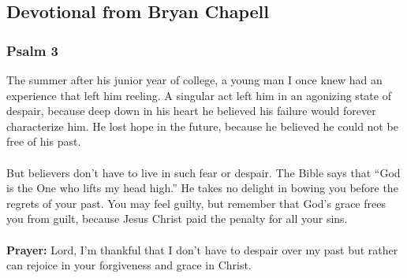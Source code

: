 \subsection{Devotional from Bryan Chapell}

\subsubsection{Psalm 3}

The summer after his junior year of college, a young man I once knew had an experience that left him reeling. A singular act left him in an agonizing state of despair, because deep down in his heart he believed his failure would forever characterize him. He lost hope in the future, because he believed he could not be free of his past.\\
\\
\noindent But believers don’t have to live in such fear or despair. The Bible says that “God is the One who lifts my head high.” He takes no delight in bowing you before the regrets of your past. You may feel guilty, but remember that God’s grace frees you from guilt, because Jesus Christ paid the penalty for all your sins.\\
\\
\noindent \textbf{Prayer:} Lord, I’m thankful that I don’t have to despair over my past but rather can rejoice in your forgiveness and grace in Christ.


